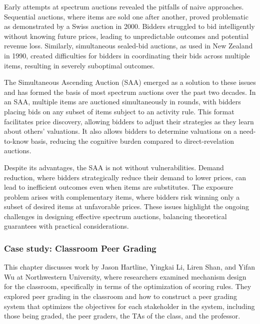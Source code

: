 \documentclass[
  letterpaper,
  numbers=noenddot,
  DIV=11,
  oneside]{scrreprt}
\theoremstyle{remark}
\begin{document}
Early attempts at spectrum auctions revealed the pitfalls of naive
approaches. Sequential auctions, where items are sold one after another,
proved problematic as demonstrated by a Swiss auction in 2000. Bidders
struggled to bid intelligently without knowing future prices, leading to
unpredictable outcomes and potential revenue loss. Similarly,
simultaneous sealed-bid auctions, as used in New Zealand in 1990,
created difficulties for bidders in coordinating their bids across
multiple items, resulting in severely suboptimal outcomes.

The Simultaneous Ascending Auction (SAA) emerged as a solution to these
issues and has formed the basis of most spectrum auctions over the past
two decades. In an SAA, multiple items are auctioned simultaneously in
rounds, with bidders placing bids on any subset of items subject to an
activity rule. This format facilitates price discovery, allowing bidders
to adjust their strategies as they learn about others' valuations. It
also allows bidders to determine valuations on a need-to-know basis,
reducing the cognitive burden compared to direct-revelation auctions.

Despite its advantages, the SAA is not without vulnerabilities. Demand
reduction, where bidders strategically reduce their demand to lower
prices, can lead to inefficient outcomes even when items are
substitutes. The exposure problem arises with complementary items, where
bidders risk winning only a subset of desired items at unfavorable
prices. These issues highlight the ongoing challenges in designing
effective spectrum auctions, balancing theoretical guarantees with
practical considerations.

\subsubsection*{Case study: Classroom Peer
Grading}\label{case-study-classroom-peer-grading}

This chapter discusses work by Jason Hartline, Yingkai Li, Liren Shan,
and Yifan Wu at Northwestern University, where researchers examined
mechanism design for the classroom, specifically in terms of the
optimization of scoring rules. They explored peer grading in the
classroom and how to construct a peer grading system that optimizes the
objectives for each stakeholder in the system, including those being
graded, the peer graders, the TAs of the class, and the professor.
\end{document}
